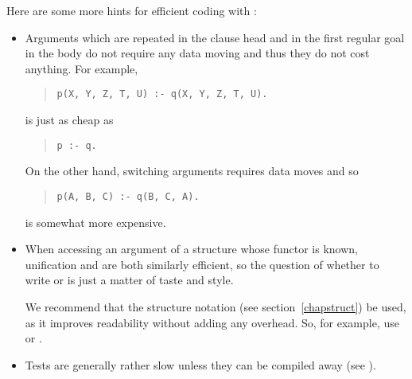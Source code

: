 Here are some more hints for efficient coding with {\eclipse}:
\begin{itemize}

\item Arguments which are repeated in the clause head and in the first
regular goal in the body do not require any data moving and thus
they do not cost anything. For example,
\begin{quote}
\begin{verbatim}
p(X, Y, Z, T, U) :- q(X, Y, Z, T, U).
\end{verbatim}
\end{quote}
is just as cheap as
\begin{quote}
\begin{verbatim}
p :- q.
\end{verbatim}
\end{quote}
On the other hand, switching arguments requires data moves and so
\begin{quote}
\begin{verbatim}
p(A, B, C) :- q(B, C, A).
\end{verbatim}
\end{quote}
is somewhat more expensive.

\item When accessing an argument of a
structure whose functor is known, unification and
 are both similarly
efficient, so the question of whether to write
 or
 is just a matter of taste and style.

We recommend that the structure notation (see section~\ref{chapstruct})
be used, as it improves readability without adding any overhead.
So, for example, use  or
.

\item Tests are generally rather slow unless they can be compiled away
(see ).



\end{itemize}
